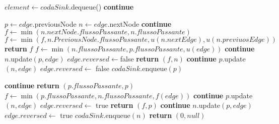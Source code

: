 \documentclass{article}
\begin{document}
\newpage
\begin{algorithm}
    \begin{algorithmic}
        \STATE $element \leftarrow codaSink.$dequeue()
        \STATE \textbf{continue}
        \ENDIF

        \STATE $p \leftarrow edge.$previousNode
        \STATE $n \leftarrow edge$.nextNode
        \STATE \textbf{continue}
        \ELSE
        \STATE $f \leftarrow \min (n.nextNode.flussoPassante, n.flussoPassante) $
        \STATE $f \leftarrow \min(f,n.PreviousNode.flussoPassante, u(n.nextEdge), u(n.previuosEdge))$
        \STATE \textbf{return} $f$
        \ENDIF
        \ENDIF
        \STATE $f \leftarrow \min (n.flussoPassante,p.flussoPassante,u(edge))$
        \STATE \textbf{continue}
        \ENDIF
        \STATE $n$.update$(p,edge)$
        \STATE $edge.reversed \leftarrow $false
        \STATE \textbf{return} $(f,n)$
        \ENDIF
        \ENDIF
        \STATE \textbf{continue}
        \ENDIF
        \STATE $p.$update$(n,edge)$
        \STATE $edge.reversed \leftarrow$ false
        \STATE $codaSink.$enqueue$(p)$
    \end{algorithmic}
\end{algorithm}
\newpage
\begin{algorithm}
    \begin{algorithmic}
        \STATE \textbf{continue}
        \ELSE
        \STATE \textbf{return} $(p.flussoPassante,p)$
        \ENDIF
        \STATE $f \leftarrow \min(p.flussoPassante,n.flussoPassante,f(edge))$
        \STATE \textbf{continue}
        \ENDIF
        \STATE $p.$update$(n,edge)$
        \STATE $edge.reversed \leftarrow$ true
        \STATE \textbf{return } $(f,p)$
        \ENDIF
        \ENDIF
        \STATE \textbf{continue}
        \ENDIF
        \STATE $n.$update$(p,edge)$
        \STATE $edge.reversed \leftarrow$ true
        \STATE $codaSink.$enqueue$(n)$
        \ENDIF
        \ENDFOR
        \ENDIF
        \ENDWHILE
        \STATE \textbf{return} $(0,null)$
    \end{algorithmic}
\end{algorithm}
\end{document}
